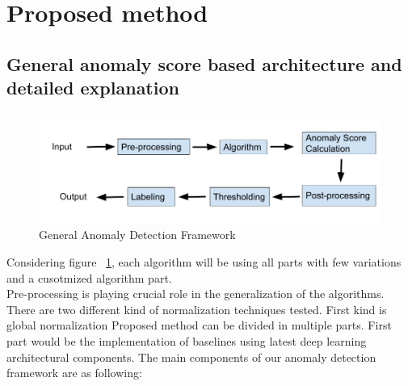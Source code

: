 \documentclass[12pt]{article}
\begin{document}
\section{Proposed method}
\subsection{General anomaly score based architecture and detailed explanation}
\begin{figure}[H]
\centering
        \includegraphics[width=\textwidth]{images/generalAnomalyDetectionFrameWork.png}
    \caption{General Anomaly Detection Framework}
    \label{generalAnomalyDetectionFrameWork}
\end{figure}
Considering figure ~\ref{generalAnomalyDetectionFrameWork}, each algorithm will be using  
all parts with few variations and a cusotmized algorithm part.\\
\break
Pre-processing is playing crucial role in the generalization of the algorithms. There are two different kind of normalization techniques tested. First kind is global normalization
Proposed method can be divided in multiple parts. First part would be the implementation of baselines using latest deep learning architectural components. The main components of our anomaly detection framework are as following:
\end{document}
